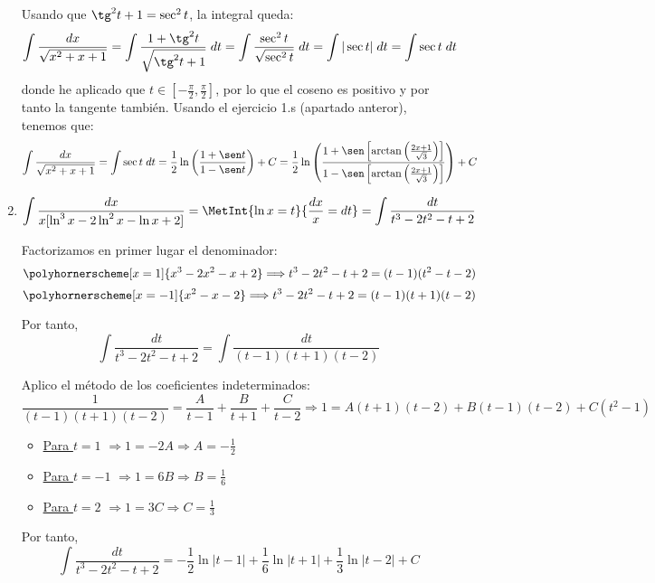 \begin{ejercicio}
\begin{enumerate}
   Usando que $\tg^2t+1=\sec^2 t$, la integral queda:
   \begin{equation*}
       \int \frac{dx}{\sqrt{x^2+x+1}} 
       = \int \frac{1+\tg^2 t}{\sqrt{\tg^2 t +1}}\;dt
       = \int \frac{\sec^2 t}{\sqrt{\sec^2 t}}\;dt
       =\int |\sec t|\;dt =\int \sec t\;dt
   \end{equation*}
   donde he aplicado que $t\in \left[-\frac{\pi}{2},\frac{\pi}{2}\right]$, por lo que el coseno es positivo y por tanto la tangente también. Usando el ejercicio 1.s (apartado anteror), tenemos que:
   \begin{equation*}
       \int \frac{dx}{\sqrt{x^2+x+1}} 
       = \int \sec t\;dt = \frac{1}{2}\ln \left(\frac{1+\sen t}{1-\sen t}\right)+C
       = \frac{1}{2}\ln \left(\frac{1+\sen\left[ \arctan \left(\frac{2x+1}{\sqrt{3}}\right)\right]}{1-\sen \left[ \arctan \left(\frac{2x+1}{\sqrt{3}}\right)\right]}\right)+C
   \end{equation*}


   \item $\displaystyle \int \frac{dx}{x[\ln^3 x-2\ln^2x-\ln x+2]} = \MetInt{\ln x =t}{\frac{dx}{x}=dt}
   = \int \frac{dt}{t^3-2t^2- t+2}$

   Factorizamos en primer lugar el denominador:
   $$\polyhornerscheme[x=1]{x^3-2x^2-x+2} \Longrightarrow t^3-2t^2-t+2=(t-1)(t^2-t-2)$$
   $$\polyhornerscheme[x=-1]{x^2-x-2} \Longrightarrow t^3-2t^2-t+2=(t-1)(t+1)(t-2)$$

   Por tanto,
   \begin{equation*}
       \int \frac{dt}{t^3-2t^2- t+2} = \int \frac{dt}{(t-1)(t+1)(t-2)}
   \end{equation*}

   Aplico el método de los coeficientes indeterminados:
   \begin{equation*}
       \frac{1}{(t-1)(t+1)(t-2)} = \frac{A}{t-1}+\frac{B}{t+1}+\frac{C}{t-2} \Longrightarrow 1=A(t+1)(t-2)+B(t-1)(t-2)+C(t^2-1)
   \end{equation*}
   \begin{itemize}
       \item \underline{Para $t=1$} $\Longrightarrow 1=-2A\Longrightarrow A=-\frac{1}{2}$
       \item \underline{Para $t=-1$} $\Longrightarrow 1=6B\Longrightarrow B=\frac{1}{6}$
       \item \underline{Para $t=2$} $\Longrightarrow 1=3C\Longrightarrow C=\frac{1}{3}$
   \end{itemize}

   Por tanto,
   \begin{equation*}
       \int \frac{dt}{t^3-2t^2- t+2} = -\frac{1}{2}\ln|t-1|+\frac{1}{6}\ln|t+1|+\frac{1}{3}\ln|t-2|+C
   \end{equation*}


\end{enumerate}
\end{ejercicio}
